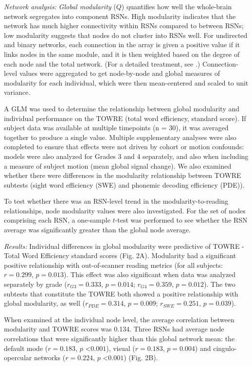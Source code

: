 \emph{Network analysis:} \textit{Global modularity} ($Q$) quantifies how well the whole-brain network segregates into component RSNs. High modularity indicates that the network has much higher connectivity within RSNs compared to between RSNs; low modularity suggests that nodes do not cluster into RSNs well. For undirected and binary networks, each connection in the array is given a positive value if it links nodes in the same module, and it is then weighted based on the degree of each node and the total network. (For a detailed treatment, see \citep{Rubinov2010}.) Connection-level values were aggregated to get node-by-node and global measures of modularity for each individual, which were then mean-centered and scaled to unit variance. 

A GLM was used to determine the relationship between global modularity and individual performance on the TOWRE (total word efficiency, standard score). If subject data was available at multiple timepoints (n = 30), it was averaged together to produce a single value. Multiple supplementary analyses were also completed to ensure that effects were not driven by cohort or motion confounds: models were also analyzed for Grades 3 and 4 separately, and also when including a measure of subject motion (mean global signal change). We also examined whether there were differences in the modularity relationship between TOWRE subtests (sight word efficiency (SWE) and phonemic decoding efficiency (PDE)).

To test whether there was an RSN-level trend in the modularity-to-reading relationships, node modularity values were also investigated. For the set of nodes comprising each RSN, a one-sample $t$-test was performed to see whether the RSN average was significantly greater than the global node average. 

\emph{Results:} Individual differences in global modularity were predictive of TOWRE - Total Word Efficiency standard scores (Fig. 2A). Modularity had a significant positive relationship with out-of-scanner reading metrics (for all subjects: $r = 0.299$, $p = 0.013$). This effect was also significant when data was analyzed separately by grade ($r_{G3} = 0.333$, $p = 0.014$; $r_{G4} = 0.359$, $p = 0.012$). The two subtests that constitute the TOWRE both showed a positive relationship with global modularity, as well ($r_{PDE} = 0.314$, $p = 0.009$; $r_{SWE} = 0.251$, $p = 0.039$). 

When examined at the individual node level, the average correlation between modularity and TOWRE scores was 0.134. Three RSNs had average node correlations that were significantly higher than this global network mean: the default mode ($r = 0.183$, $p$ \textless $0.001$), visual ($r = 0.183$, $p = 0.004$) and cingulo-opercular networks ($r = 0.224$, $p$ \textless $0.001$) (Fig. 2B). 


